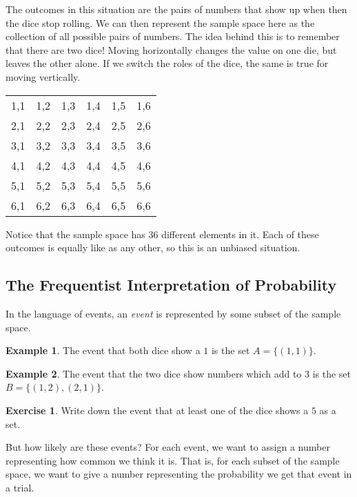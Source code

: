\documentclass[12pt,letterpaper]{article}
\theoremstyle{definition}
\newtheorem{example}{Example}
\newtheorem{exercise}[question]{Exercise}
\begin{document}
The outcomes in this situation are the pairs of numbers that show up when then the dice stop rolling.
We can then represent the sample space here as the collection of all possible pairs of numbers.
The idea behind this is to remember that there are two dice!
Moving horizontally changes the value on one die, but leaves the other alone.
If we switch the roles of the dice, the same is true for moving vertically.
\begin{center}
\begin{tabular}{cccccc}
1,1 & 1,2 & 1,3 & 1,4 & 1,5 & 1,6\\
2,1 & 2,2 & 2,3 & 2,4 & 2,5 & 2,6\\
3,1 & 3,2 & 3,3 & 3,4 & 3,5 & 3,6\\
4,1 & 4,2 & 4,3 & 4,4 & 4,5 & 4,6\\
5,1 & 5,2 & 5,3 & 5,4 & 5,5 & 5,6\\
6,1 & 6,2 & 6,3 & 6,4 & 6,5 & 6,6
\end{tabular}
\end{center}

Notice that the sample space has $36$ different elements in it.
Each of these outcomes is equally like as any other, so this is an unbiased situation.

\subsection*{The Frequentist Interpretation of Probability}

In the language of events, an \emph{event} is represented by some subset of the sample space.

\begin{example}
The event that both dice show a $1$ is the set $A = \{ (1,1) \}$.
\end{example}

\begin{example}
The event that the two dice show numbers which add to $3$ is the set $B = \{ (1,2), (2,1) \}$.
\end{example}

\begin{exercise}
Write down the event that at least one of the dice shows a $5$ as a set.
\end{exercise}

But how likely are these events?
For each event, we want to assign a number representing how common we think it is.
That is, for each subset of the sample space, we want to give a number representing the probability we get that event in a trial.
\end{document}
